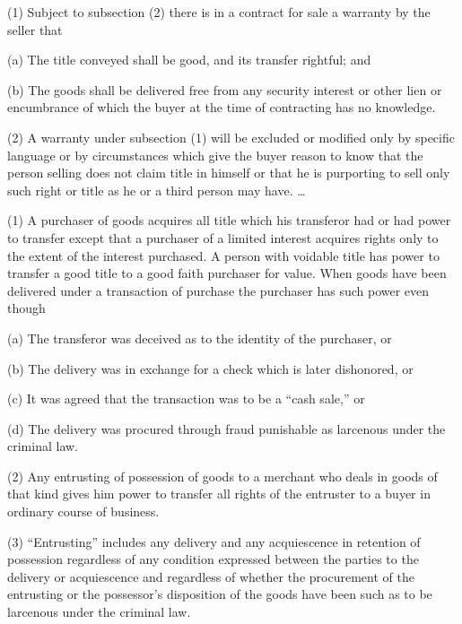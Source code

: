 

(1) Subject to subsection (2) there is in a contract for sale a warranty by the
seller that

\begin{statute}
\item (a) The title conveyed shall be good, and its transfer rightful; and

\item (b) The goods shall be delivered free from any security interest or other
lien or encumbrance of which the buyer at the time of contracting has no
knowledge.
\end{statute}

(2) A warranty under subsection (1) will be excluded or modified only by
specific language or by circumstances which give the buyer reason to know that
the person selling does not claim title in himself or that he is purporting to
sell only such right or title as he or a third person may have. \ldots


(1) A purchaser of goods acquires all title which his transferor had or had
power to transfer except that a purchaser of a limited interest acquires rights
only to the extent of the interest purchased. A person with voidable title has
power to transfer a good title to a good faith purchaser for value. When goods
have been delivered under a transaction of purchase the purchaser has such
power even though

\begin{statute}
\item (a) The transferor was deceived as to the identity of the purchaser, or

\item (b) The delivery was in exchange for a check which is later dishonored, or

\item (c) It was agreed that the transaction was to be a ``cash sale,'' or

\item (d) The delivery was procured through fraud punishable as larcenous under
the criminal law.
\end{statute}

(2) Any entrusting of possession of goods to a merchant who deals in goods of
that kind gives him power to transfer all rights of the entruster to a buyer in
ordinary course of business.

(3) ``Entrusting'' includes any delivery and any acquiescence in retention of
possession regardless of any condition expressed between the parties to the
delivery or acquiescence and regardless of whether the procurement of the
entrusting or the possessor's disposition of the goods have been such as to be
larcenous under the criminal law.

